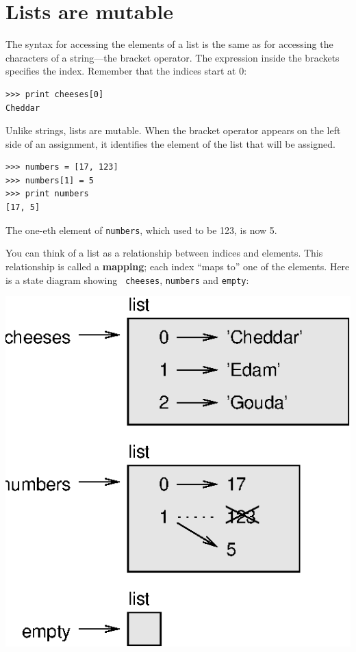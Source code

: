 \documentclass[10pt]{book}
\begin{document}
\section{Lists are mutable}


The syntax for accessing the elements of a list is the same as for
accessing the characters of a string---the bracket operator.  The
expression inside the brackets specifies the index.  Remember that the
indices start at 0:

\beforeverb
\begin{verbatim}
>>> print cheeses[0]
Cheddar
\end{verbatim}
\afterverb
%
Unlike strings, lists are mutable.  When the bracket operator appears
on the left side of an assignment, it identifies the element of the
list that will be assigned.


\beforeverb
\begin{verbatim}
>>> numbers = [17, 123]
>>> numbers[1] = 5
>>> print numbers
[17, 5]
\end{verbatim}
\afterverb
%
The one-eth element of {\tt numbers}, which
used to be 123, is now 5.


You can think of a list as a relationship between indices and
elements.  This relationship is called a {\bf mapping}; each index
``maps to'' one of the elements.  Here is a state diagram showing {\tt
cheeses}, {\tt numbers} and {\tt empty}:


\beforefig
\centerline{\includegraphics{figs/list_state.eps}}
\afterfig
\end{document}
